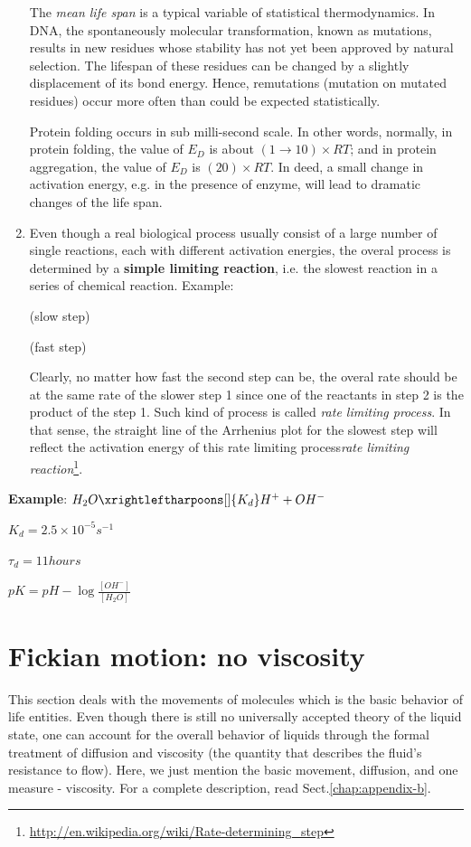 \begin{enumerate}
  The {\it mean life span} is a typical variable of statistical
  thermodynamics. In DNA, the spontaneously molecular transformation,
  known as mutations, results in new residues whose stability has not
  yet been approved by natural selection. The lifespan of these
  residues can be changed by a slightly displacement of its bond
  energy. Hence, remutations (mutation on mutated residues) occur more
  often than could be expected statistically.

  Protein folding occurs in sub milli-second scale. In other words,
  normally, in protein folding, the value of $E_D$ is about
  $(1\rightarrow10)\times RT$; and in protein aggregation, the value
  of $E_D$ is $(20)\times RT$. In deed, a small change in activation
  energy, e.g. in the presence of enzyme, will lead to dramatic
  changes of the life span.


\item Even though a real biological process usually consist of a large
  number of single reactions, each with different activation energies,
  the overal process is determined by a
  {\bf simple limiting reaction}, i.e. the slowest reaction in a
  series of chemical reaction. Example:

 (slow step)

 (fast step)

Clearly, no matter how fast the second step can be, the overal rate
should be at the same rate of the slower step 1 since one of the
reactants in step 2 is the product of the step 1. Such kind of process
is called {\it rate limiting process}. In that sense, the straight
line of the Arrhenius plot for the slowest step will reflect the
activation energy of this rate limiting process\textit{rate limiting
  reaction}\footnote{\url{http://en.wikipedia.org/wiki/Rate-determining_step}}.
\end{enumerate}

{\bf Example}: $H_2O \xrightleftharpoons[]{K_d} H^+ + OH^-$

$K_d = 2.5\times 10^{-5} s^{-1}$

$\tau_d = 11 hours$

$pK = pH - \log \frac{[OH^-]}{[H_2O]}$


\section{Fickian motion: no viscosity}
\label{sec:transport-process}

This section deals with the movements of molecules which is the basic
behavior of life entities. Even though there is still no universally
accepted theory of the liquid state, one can account for the overall
behavior of liquids through the formal treatment of diffusion and
viscosity (the quantity that describes the fluid's resistance to
flow). Here, we just mention the basic movement, diffusion, and one
measure - viscosity. For a complete description, read
Sect.\ref{chap:appendix-b}. 


